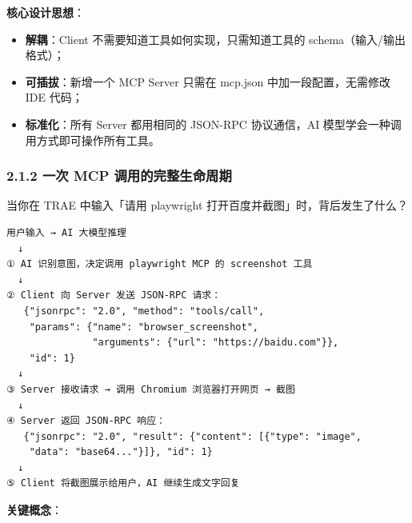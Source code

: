 \documentclass[
  american,
  chinese,
]{ctexart}
\providecommand{\tightlist}{%
  \setlength{\itemsep}{0pt}\setlength{\parskip}{0pt}}
\begin{document}
\foreignlanguage{american}{}

\textbf{{核心设计思想}}{：}\foreignlanguage{american}{}

\begin{itemize}
\tightlist
\item
  {\textbf{\foreignlanguage{american}{解耦}}}{：}\foreignlanguage{american}{Client }{不需要知道工具如何实现，只需知道工具的}\foreignlanguage{american}{ schema}{（输入}{/}{输出格式）；}\foreignlanguage{american}{}
\item
  {\textbf{\foreignlanguage{american}{可插拔}}}{：}\foreignlanguage{american}{}{新增一个}\foreignlanguage{american}{ MCP Server }{只需在}\foreignlanguage{american}{ mcp.json }{中加一段配置，无需修改}\foreignlanguage{american}{ IDE }{代码；}\foreignlanguage{american}{}
\item
  {\textbf{\foreignlanguage{american}{标准化}}}{：所有}\foreignlanguage{american}{ Server }{都用相同的}\foreignlanguage{american}{ JSON-RPC }{协议通信，}\foreignlanguage{american}{AI }{模型学会一种调用方式即可操作所有工具。}\foreignlanguage{american}{}
\end{itemize}

\subsubsection{\texorpdfstring{\foreignlanguage{american}{2.1.2 }{一次}\foreignlanguage{american}{ MCP }{调用的完整生命周期}}{2.1.2 一次 MCP 调用的完整生命周期}}\label{mcp-call-lifecycle}

{当你在}\foreignlanguage{american}{ TRAE }{中输入「请用}\foreignlanguage{american}{ playwright }{打开百度并截图」时，背后发生了什么？}\foreignlanguage{american}{}

\begin{verbatim}
用户输入 → AI 大模型推理
  ↓
① AI 识别意图，决定调用 playwright MCP 的 screenshot 工具
  ↓
② Client 向 Server 发送 JSON-RPC 请求：
   {"jsonrpc": "2.0", "method": "tools/call",
    "params": {"name": "browser_screenshot",
               "arguments": {"url": "https://baidu.com"}},
    "id": 1}
  ↓
③ Server 接收请求 → 调用 Chromium 浏览器打开网页 → 截图
  ↓
④ Server 返回 JSON-RPC 响应：
   {"jsonrpc": "2.0", "result": {"content": [{"type": "image",
    "data": "base64..."}]}, "id": 1}
  ↓
⑤ Client 将截图展示给用户，AI 继续生成文字回复
\end{verbatim}

\textbf{{关键概念}}{：}\foreignlanguage{american}{}
\end{document}
